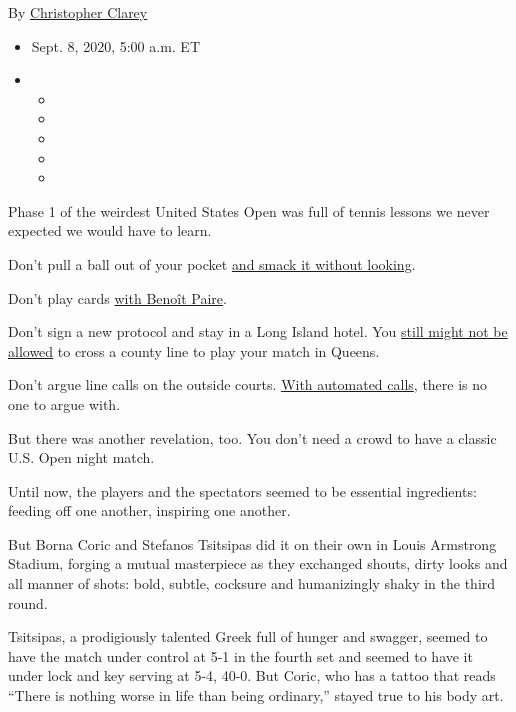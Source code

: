 By
\href{https://www.nytimes3xbfgragh.onion/by/christopher-clarey}{Christopher
Clarey}

\begin{itemize}
\item
  Sept. 8, 2020, 5:00 a.m. ET
\item
  \begin{itemize}
  \item
  \item
  \item
  \item
  \item
  \end{itemize}
\end{itemize}

Phase 1 of the weirdest United States Open was full of tennis lessons we
never expected we would have to learn.

Don't pull a ball out of your pocket
\href{https://www.nytimes3xbfgragh.onion/2020/09/07/sports/tennis/novak-djokovic-us-open.html}{and
smack it without looking}.

Don't play cards
\href{https://www.nytimes3xbfgragh.onion/2020/08/31/sports/tennis/us-open-coronavirus-contact-tracing.html}{with
Benoît Paire}.

Don't sign a new protocol and stay in a Long Island hotel. You
\href{https://www.nytimes3xbfgragh.onion/2020/09/05/sports/the-us-open-virus-quarantine-chaos.html}{still
might not be allowed} to cross a county line to play your match in
Queens.

Don't argue line calls on the outside courts.
\href{https://www.nytimes3xbfgragh.onion/2020/08/03/sports/tennis/us-open-hawkeye-line-judges.html}{With
automated calls}, there is no one to argue with.

But there was another revelation, too. You don't need a crowd to have a
classic U.S. Open night match.

Until now, the players and the spectators seemed to be essential
ingredients: feeding off one another, inspiring one another.

But Borna Coric and Stefanos Tsitsipas did it on their own in Louis
Armstrong Stadium, forging a mutual masterpiece as they exchanged
shouts, dirty looks and all manner of shots: bold, subtle, cocksure and
humanizingly shaky in the third round.

Tsitsipas, a prodigiously talented Greek full of hunger and swagger,
seemed to have the match under control at 5-1 in the fourth set and
seemed to have it under lock and key serving at 5-4, 40-0. But Coric,
who has a tattoo that reads ``There is nothing worse in life than being
ordinary,'' stayed true to his body art.

